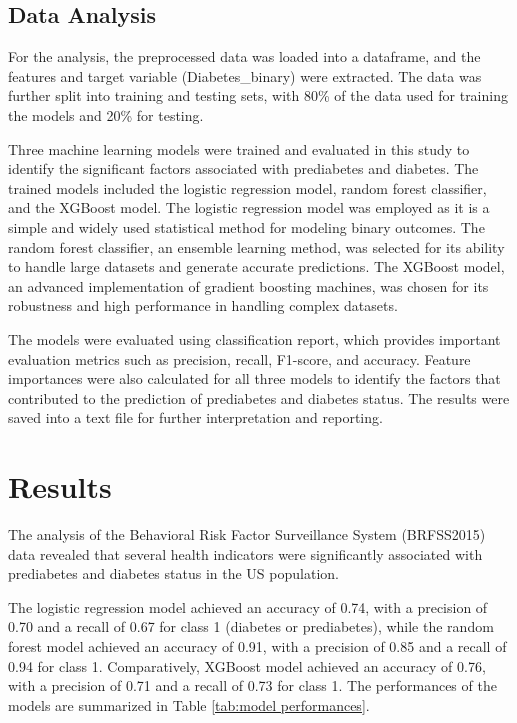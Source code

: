 \documentclass[12pt]{article}
\begin{document}
\subsection{Data Analysis}

For the analysis, the preprocessed data was loaded into a dataframe, and the features and target variable (Diabetes\_binary) were extracted. The data was further split into training and testing sets, with 80\% of the data used for training the models and 20\% for testing.

Three machine learning models were trained and evaluated in this study to identify the significant factors associated with prediabetes and diabetes. The trained models included the logistic regression model, random forest classifier, and the XGBoost model. The logistic regression model was employed as it is a simple and widely used statistical method for modeling binary outcomes. The random forest classifier, an ensemble learning method, was selected for its ability to handle large datasets and generate accurate predictions. The XGBoost model, an advanced implementation of gradient boosting machines, was chosen for its robustness and high performance in handling complex datasets.

The models were evaluated using classification report, which provides important evaluation metrics such as precision, recall, F1-score, and accuracy. Feature importances were also calculated for all three models to identify the factors that contributed to the prediction of prediabetes and diabetes status. The results were saved into a text file for further interpretation and reporting.

\section{Results}

The analysis of the Behavioral Risk Factor Surveillance System (BRFSS2015) data revealed that several health indicators were significantly associated with prediabetes and diabetes status in the US population.

The logistic regression model achieved an accuracy of 0.74, with a precision of 0.70 and a recall of 0.67 for class 1 (diabetes or prediabetes), while the random forest model achieved an accuracy of 0.91, with a precision of 0.85 and a recall of 0.94 for class 1. Comparatively, XGBoost model achieved an accuracy of 0.76, with a precision of 0.71 and a recall of 0.73 for class 1. The performances of the models are summarized in Table \ref{tab:model performances}.
\end{document}
